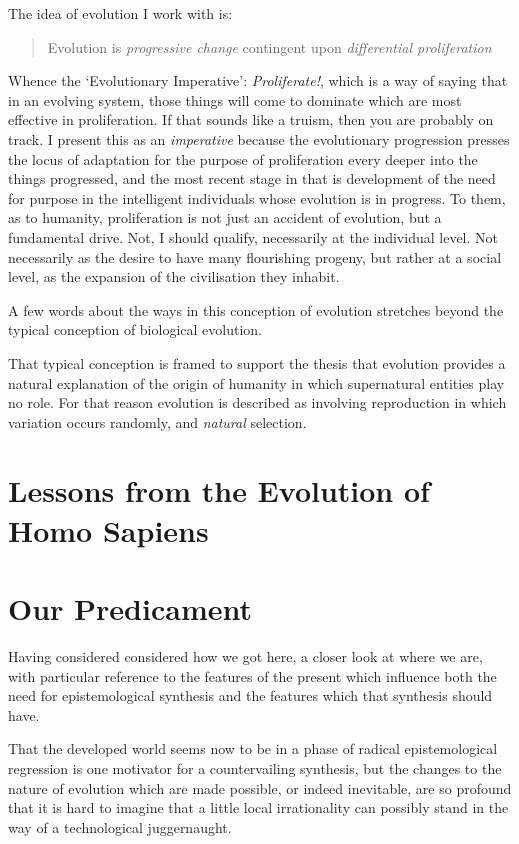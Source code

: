 {The idea of evolution I work with is:

\begin{quote}
Evolution is \emph{progressive change} contingent upon \emph{differential proliferation}
\end{quote}

Whence the `Evolutionary Imperative': \emph{Proliferate!}, which is a way of saying that in an evolving system, those things will come to dominate which are most effective in proliferation.
If that sounds like a truism, then you are probably on track.
I present this as an \emph{imperative} because the evolutionary progression presses the locus of adaptation for the purpose of proliferation every deeper into the things progressed, and the most recent stage in that is development of the need for purpose in the intelligent individuals whose evolution is in progress.
To them, as to humanity, proliferation is not just an accident of evolution, but a fundamental drive.
Not, I should qualify, necessarily at the individual level.
Not necessarily as the desire to have many flourishing progeny, but rather at a social level, as the expansion of the civilisation they inhabit.

A few words about the ways in this conception of evolution stretches beyond the typical conception of biological evolution.

That typical conception is framed to support the thesis that evolution provides a natural explanation of the origin of humanity in which supernatural entities play no role.
For that reason evolution is described as involving reproduction in which variation occurs randomly, and \emph{natural} selection.

}%

\section{Lessons from the Evolution of Homo Sapiens}

\section{Our Predicament}

Having considered considered how we got here, a closer look at where we are, with particular reference to the features of the present which influence both the need for epistemological synthesis and the features which that synthesis should have.

That the developed world seems now to be in a phase of radical epistemological regression is one motivator for a countervailing synthesis, but the changes to the nature of evolution which are made possible, or indeed inevitable, are so profound that it is hard to imagine that a little local irrationality can possibly stand in the way of a technological juggernaught.

